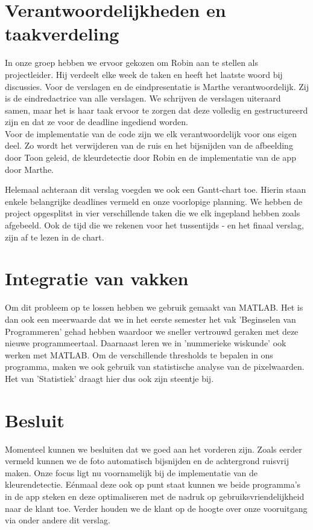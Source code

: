 \documentclass[a4paper,kulak]{kulakarticle}
\begin{document}
	\section{Verantwoordelijkheden en taakverdeling}		
		In onze groep hebben we ervoor gekozen om Robin aan te stellen als projectleider. Hij verdeelt elke week de taken en heeft het laatste woord bij discussies. 
		Voor de verslagen en de eindpresentatie is Marthe verantwoordelijk. Zij is de eindredactrice van alle verslagen. We schrijven de verslagen uiteraard samen, maar het is haar taak ervoor te zorgen dat deze volledig en gestructureerd zijn en dat ze voor de deadline ingediend worden.\\
		Voor de implementatie van de code zijn we elk verantwoordelijk voor ons eigen deel. Zo wordt het verwijderen van de ruis en het bijsnijden van de afbeelding door Toon geleid, de kleurdetectie door Robin en de implementatie van de app door Marthe.
		
		Helemaal achteraan dit verslag voegden we ook een Gantt-chart toe. Hierin staan enkele belangrijke deadlines vermeld en onze voorlopige planning. We hebben de project opgesplitst in vier verschillende taken die we elk ingepland hebben zoals afgebeeld. Ook de tijd die we rekenen voor het tussentijds - en het finaal verslag, zijn af te lezen in de chart.
		
	\section{Integratie van vakken}
		Om dit probleem op te lossen hebben we gebruik gemaakt van MATLAB. Het is dan ook een meerwaarde dat we in het eerste semester het vak 'Beginselen van Programmeren' gehad hebben waardoor we sneller vertrouwd geraken met deze nieuwe programmeertaal. Daarnaast leren we in 'nummerieke wiskunde' ook werken met MATLAB. Om de verschillende thresholds te bepalen in ons programma, maken we ook gebruik van statistische analyse van de pixelwaarden. Het van 'Statistiek' draagt hier dus ook zijn steentje bij.
	
	\section{Besluit}	
		Momenteel kunnen we besluiten dat we goed aan het vorderen zijn. Zoals eerder vermeld kunnen we de foto automatisch bijsnijden en de achtergrond ruisvrij maken. Onze focus ligt nu voornamelijk bij de implementatie van de kleurendetectie. Eénmaal deze ook op punt staat kunnen we beide programma's in de app steken en deze optimaliseren met de nadruk op gebruiksvriendelijkheid naar de klant toe. Verder houden we de klant op de hoogte over onze vooruitgang via onder andere dit verslag. 
	\newpage		
	
\end{document}
